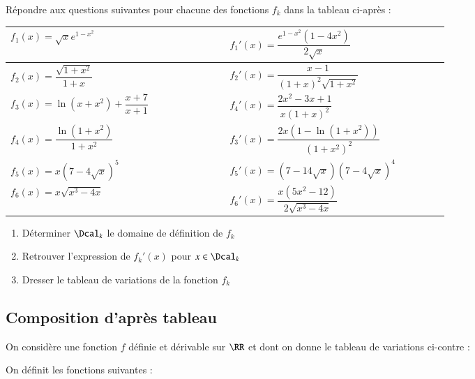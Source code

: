 \documentclass[oneside,12pt]{article}          %
\begin{document}
Répondre aux questions suivantes pour chacune des fonctions $f_k$ dans la tableau ci-après :
\begin{center}
\renewcommand{\arraystretch}{3.3}
\begin{tabular}{| P{0.4\linewidth} | P{0.4\linewidth} |} \hline
	$f_1(x)=\sqrt{x}e^{1-x^2}$ & $f_1'(x)=\dfrac{e^{1-x^2}(1-4x^2)}{2\sqrt{x}}$ \\ \hline
	$f_2(x)=\dfrac{\sqrt{1+x^2}}{1+x}$ & $f_2'(x)=\dfrac{x-1}{(1+x)^2\sqrt{1+x^2}}$ \\ \hline
	$f_3(x)=\ln(x + x^2) + \dfrac{x + 7}{x + 1}$ & $f_4'(x)=\dfrac{2x^2-3x+1}{x(1+x)^2}$ \\ \hline
	$f_4(x)=\dfrac{\ln\left(1+x^2\right)}{1+x^2}$ & $f_3'(x)=\dfrac{2x\left(1-\ln(1+x^2)\right)}{{(1+x^2)}^2}$ \\ \hline
	$f_5(x)=x\left(7-4\sqrt{x}\right)^5$ & $f_5'(x)=(7-14\sqrt{x})\left(7-4\sqrt{x}\right)^4$ \\ \hline
	$f_6(x)=x\sqrt{x^3-4x}$ & $f_6'(x)=\dfrac{x(5x^2-12)}{2\sqrt{x^3-4x}}$ \\ \hline
\end{tabular}
\end{center}
\begin{enumerate}
	\item Déterminer $\Dcal_k$ le domaine de définition de $f_k$
	\item Retrouver l'expression de $f_k'(x)$ pour $x\in\Dcal_k$
	\item Dresser le tableau de variations de la fonction $f_k$
\end{enumerate}



\subsection{Composition d'après tableau}
On considère une fonction $f$ définie et dérivable sur $\RR$ et dont on donne le tableau de variations ci-contre :


On définit les fonctions suivantes :
\end{document}
